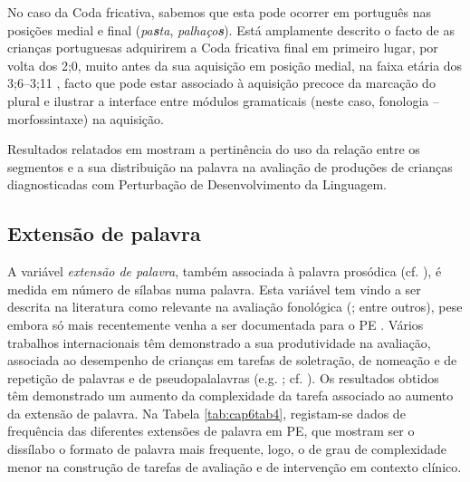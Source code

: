 \documentclass[output=paper,colorlinks,citecolor=brown,booklanguage=portuguese]{langscibook}
\begin{document}
No caso da Coda fricativa, sabemos que esta pode ocorrer em português nas posições medial e final (\emph{pa\textbf{s}ta}, \emph{palhaço\textbf{s}}). Está amplamente descrito o facto de as crianças portuguesas adquirirem a Coda fricativa final em primeiro lugar, por volta dos 2;0, muito antes da sua aquisição em posição medial, na faixa etária dos 3;6--3;11 \citep{Freitas1997, Mendes2013a, Amorim2014, Baptista2015, Ramalho2017}, facto que pode estar associado à aquisição precoce da marcação do plural e ilustrar a interface entre módulos gramaticais (neste caso, fonologia -- morfos\-sintaxe) na aquisição.

Resultados relatados em \citet{Lousada2012a} mostram a pertinência do uso da relação entre os segmentos e a sua distribuição na palavra na avaliação de produções de crianças diagnosticadas com Perturbação de Desenvolvimento da Linguagem.


\subsection{Extensão de palavra}
\largerpage
A variável \emph{extensão de palavra}, também associada à palavra prosódica (cf. ), é medida em número de sílabas numa palavra. Esta variável tem vindo a ser descrita na literatura como relevante na avaliação fonológica (\citealp{Stackhouse1993, Bradford1996, Bernhardt2000}; entre outros), pese embora só mais recentemente venha a ser documentada para o PE \citep{Ramalho2017, Ramalho2017a}. Vários trabalhos internacionais têm demonstrado a sua produtividade na avaliação, associada ao desempenho de crianças em tarefas de soletração, de nomeação e de repetição de palavras e de pseudopalalavras (e.g. \citealp{James2006, Mason2015, Masso2017}; cf. ). Os resultados obtidos têm demonstrado um aumento da complexidade da tarefa associado ao aumento da extensão de palavra. Na Tabela \ref{tab:cap6tab4},  re\-gistam-se dados de frequência das diferentes extensões de palavra em PE, que mostram ser o dissílabo o formato de palavra mais frequente, logo, o de grau de complexidade menor na construção de tarefas de avaliação e de intervenção em contexto clínico.
\end{document}
